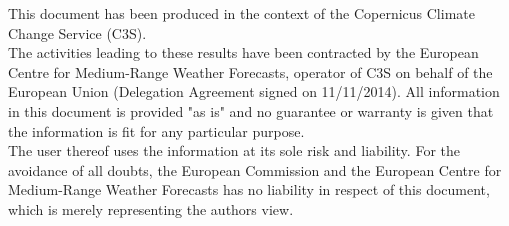 \documentclass[a4paper,12pt]{article}
\newcounter{FramedDepth}
\newenvironment{Framed}{%
  \addtocounter{FramedDepth}{1}
  \ifcase\theFramedDepth\def\FrameColour{white!50}%
    \or\def\FrameColour{white!50}%
    \or\def\FrameColour{white!50}%
    \or\def\FrameColour{white!50}%
    \fi%
  \begin{mdframed}[style=Framed,backgroundcolor=\FrameColour]%
}{\end{mdframed}\addtocounter{FramedDepth}{-1}}
\begin{document}
\newpage

\vspace*{\fill}
\begin{Framed}
\fontsize{9}{11}\selectfont
This document has been produced in the context of the Copernicus Climate Change Service (C3S).\\
The activities leading to these results have been contracted by the European Centre for Medium-Range Weather Forecasts, operator of C3S on behalf of the European Union (Delegation Agreement signed on 11/11/2014). All information in this document is provided "as is" and no guarantee or warranty is given that the information is fit for any particular purpose.\\
The user thereof uses the information at its sole risk and liability. For the avoidance of all doubts, the European Commission
and the European Centre for Medium-Range Weather Forecasts has no liability in respect of this document, which is merely representing the authors view.
\end{Framed}



\newpage
\end{document}
